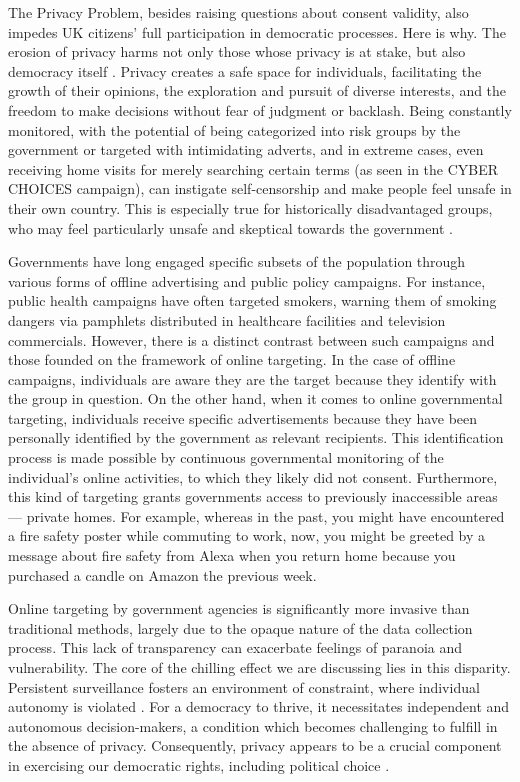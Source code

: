 \documentclass[preprint]{acmart}
\begin{document}
The Privacy Problem, besides raising questions about consent validity, also impedes UK citizens' full participation in democratic processes. Here is why. The erosion of privacy harms not only those whose privacy is at stake, but also democracy itself \cite{lever2006,debrabander_2020}. Privacy creates a safe space for individuals, facilitating the growth of their opinions, the exploration and pursuit of diverse interests, and the freedom to make decisions without fear of judgment or backlash. Being constantly monitored, with the potential of being categorized into risk groups by the government or targeted with intimidating adverts, and in extreme cases, even receiving home visits for merely searching certain terms (as seen in the CYBER CHOICES campaign), can instigate self-censorship and make people feel unsafe in their own country. This is especially true for historically disadvantaged groups, who may feel particularly unsafe and skeptical towards the government \cite{lever2006}.



Governments have long engaged specific subsets of the population through various forms of offline advertising and public policy campaigns. For instance, public health campaigns have often targeted smokers, warning them of smoking dangers via pamphlets distributed in healthcare facilities and television commercials. However, there is a distinct contrast between such campaigns and those founded on the framework of online targeting. In the case of offline campaigns, individuals are aware they are the target because they identify with the group in question. On the other hand, when it comes to online governmental targeting, individuals receive specific advertisements because they have been personally identified by the government as relevant recipients. This identification process is made possible by continuous governmental monitoring of the individual's online activities, to which they likely did not consent. Furthermore, this kind of targeting grants governments access to previously inaccessible areas --- private homes. For example, whereas in the past, you might have encountered a fire safety poster while commuting to work, now, you might be greeted by a message about fire safety from Alexa when you return home because you purchased a candle on Amazon the previous week.


Online targeting by government agencies is significantly more invasive than traditional methods, largely due to the opaque nature of the data collection process. This lack of transparency can exacerbate feelings of paranoia and vulnerability. The core of the chilling effect we are discussing lies in this disparity. Persistent surveillance fosters an environment of constraint, where individual autonomy is violated \cite{benn_lazar_2022}. For a democracy to thrive, it necessitates independent and autonomous decision-makers, a condition which becomes challenging to fulfill in the absence of privacy. Consequently, privacy appears to be a crucial component in exercising our democratic rights, including political choice \cite{lever2006}.
\end{document}

